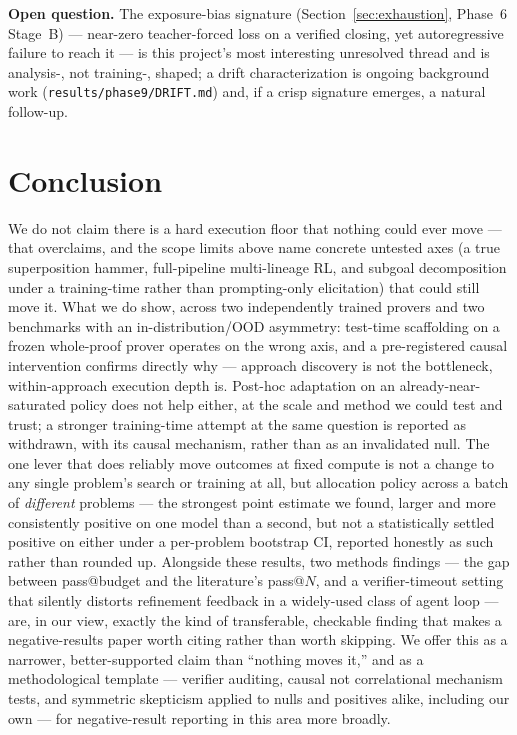 \documentclass{article}
\begin{document}
\textbf{Open question.} The exposure-bias signature (Section~\ref{sec:exhaustion}, Phase~6 Stage~B) ---
near-zero teacher-forced loss on a verified closing, yet autoregressive failure to reach it --- is this
project's most interesting unresolved thread and is analysis-, not training-, shaped; a drift
characterization is ongoing background work (\texttt{results/phase9/DRIFT.md}) and, if a crisp
signature emerges, a natural follow-up.

\section{Conclusion}

We do not claim there is a hard execution floor that nothing could ever move --- that overclaims, and
the scope limits above name concrete untested axes (a true superposition hammer, full-pipeline
multi-lineage RL, and subgoal decomposition under a training-time rather than prompting-only
elicitation) that could still move it. What we do show, across
two independently trained provers and two benchmarks with an in-distribution/OOD asymmetry: test-time
scaffolding on a frozen whole-proof prover operates on the wrong axis, and a pre-registered causal
intervention confirms directly why --- approach discovery is not the bottleneck, within-approach
execution depth is. Post-hoc adaptation on an already-near-saturated policy does not help either, at the
scale and method we could test and trust; a stronger training-time attempt at the same question is
reported as withdrawn, with its causal mechanism, rather than as an invalidated null. The one lever that
does reliably move outcomes at fixed compute is not a change to any single problem's search or training
at all, but allocation policy across a batch of \emph{different} problems --- the strongest point
estimate we found, larger and more consistently positive on one model than a second, but not a
statistically settled positive on either under a per-problem bootstrap CI, reported honestly as such
rather than rounded up. Alongside these results, two
methods findings --- the gap between pass@budget and the literature's pass@$N$, and a verifier-timeout
setting that silently distorts refinement feedback in a widely-used class of agent loop --- are, in our
view, exactly the kind of transferable, checkable finding that makes a negative-results paper worth
citing rather than worth skipping. We offer this as a narrower, better-supported claim than ``nothing
moves it,'' and as a methodological template --- verifier auditing, causal not correlational mechanism
tests, and symmetric skepticism applied to nulls and positives alike, including our own --- for
negative-result reporting in this area more broadly.
\end{document}
